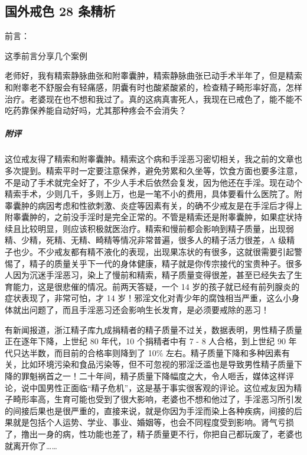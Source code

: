 \subsection{国外戒色 28 条精析}

前言：

这季前言分享几个案例

\begin{case}
    老师好，我有精索静脉曲张和附睾囊肿，精索静脉曲张已动手术半年了，但是精索和附睾老不舒服会有轻痛感，阴囊有时也酸紧酸紧的，检查精子畸形率好高，怎样治疗。老婆现在也不想和我过了。真的这病真害死人，我现在已戒色了，能不能不吃药靠保养能自动好吗，尤其那种疼会不会消失？
    \subparagraph{附评} 这位戒友得了精索和附睾囊肿。精索这个病和手淫恶习密切相关，我之前的文章也多次提到。精索平时一定要注意保养，避免劳累和久坐等，饮食方面也要多注意，不是动了手术就完全好了，不少人手术后依然会复发，因为他还在手淫。现在动个精索手术，少则几千，多则上万，也是一笔不小的费用，具体要看什么医院了。附睾囊肿的病因考虑和性欲刺激、炎症等因素有关，的确不少戒友是在手淫后才得上附睾囊肿的，之前没手淫时是完全正常的。不管是精索还是附睾囊肿，如果症状持续且比较明显，则应该积极就医治疗。精索和慢前都会影响到精子质量，出现弱精、少精，死精、无精、畸精等情况非常普遍，很多人的精子活力很差，A 级精子也少。不少戒友都有精不液化的表现，出现果冻状的有很多，这就很需要引起警惕了，精子的质量关乎下一代的身体健康，精子就是你传宗接代的宝贵种子。很多人因为沉迷手淫恶习，染上了慢前和精索，精子质量变得很差，甚至已经失去了生育能力，这是很悲催的情况。前两天答疑，一个 14 岁的孩子就已经有前列腺炎的症状表现了，非常可怕，才 14 岁！邪淫文化对青少年的腐蚀相当严重，这么小身体就出问题了，而且手淫恶习还会影响生长发育，是必须要戒除的恶习！

    有新闻报道，浙江精子库九成捐精者的精子质量不过关，数据表明，男性精子质量正在逐年下降，上世纪 80 年代，10 个捐精者中有 7 - 8 人合格，到上世纪 90 年代只达半数，而目前的合格率则降到了 10\% 左右。精子质量下降和多种因素有关，比如环境污染和食品污染等，但不可忽视的邪淫泛滥也是导致男性精子质量下降的罪魁祸首之一！二十年间，精子质量下降幅度之大，令人咂舌，媒体这样评论，说中国男性正面临“精子危机”，这是基于事实很客观的评论。这位戒友因为精子畸形率高，生育可能也受到了很大影响，老婆也不想和他过了，手淫恶习所引发的间接后果也是很严重的，直接来说，就是你因为手淫而染上各种疾病，间接的后果就是包括个人运势、学业、事业、婚姻等，也会不同程度受到影响。肾气亏损了，撸出一身的病，性功能也差了，精子质量更不行，你把自己都玩废了，老婆也就离开你了……
\end{case}

